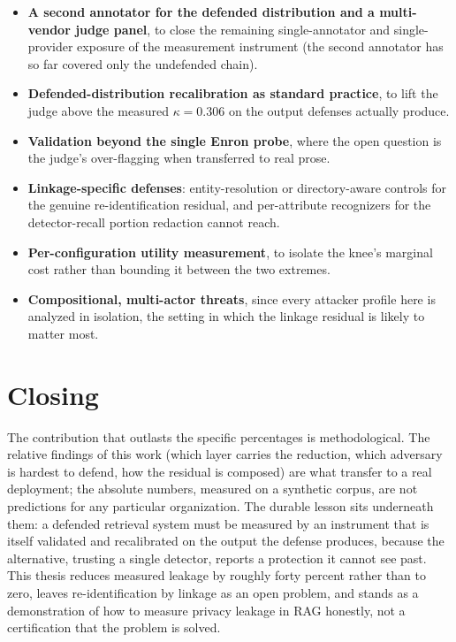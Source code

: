 \documentclass[11pt,a4paper]{report}
\begin{document}
\begin{itemize}[leftmargin=1.4em, itemsep=2pt]
  \item \textbf{A second annotator for the defended distribution and a multi-vendor judge
    panel}, to close the remaining single-annotator and single-provider exposure of the
    measurement instrument (the second annotator has so far covered only the undefended chain).
  \item \textbf{Defended-distribution recalibration as standard practice}, to lift the judge
    above the measured $\kappa = 0.306$ on the output defenses actually produce.
  \item \textbf{Validation beyond the single Enron probe}, where the open question is the
    judge's over-flagging when transferred to real prose.
  \item \textbf{Linkage-specific defenses}: entity-resolution or directory-aware controls for
    the genuine re-identification residual, and per-attribute recognizers for the
    detector-recall portion redaction cannot reach.
  \item \textbf{Per-configuration utility measurement}, to isolate the knee's marginal cost
    rather than bounding it between the two extremes.
  \item \textbf{Compositional, multi-actor threats}, since every attacker profile here is
    analyzed in isolation, the setting in which the linkage residual is likely to matter most.
\end{itemize}

\section{Closing}
\label{sec:concl-closing}

The contribution that outlasts the specific percentages is methodological. The relative findings
of this work (which layer carries the reduction, which adversary is hardest to defend, how the
residual is composed) are what transfer to a real deployment; the absolute numbers, measured on
a synthetic corpus, are not predictions for any particular organization. The durable lesson sits
underneath them: a defended retrieval system must be measured by an instrument that is itself
validated and recalibrated on the output the defense produces, because the alternative, trusting
a single detector, reports a protection it cannot see past. This thesis reduces measured leakage
by roughly forty percent rather than to zero, leaves re-identification by linkage as an open
problem, and stands as a demonstration of how to measure privacy leakage in RAG honestly, not
a certification that the problem is solved.

\ifdefined\ThesisMaster\else
  
\end{document}
